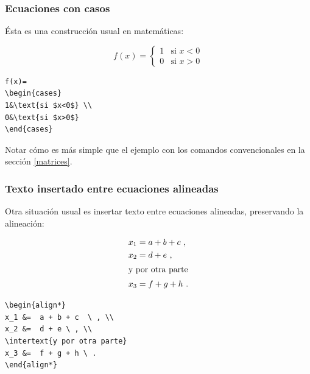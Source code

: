 {\subsubsection{Ecuaciones con casos}

\'Esta es una construcci\'on usual en matem\'aticas:

\vspace{.3cm}
{\small
\begin{minipage}[c]{5cm}
$$
f(x)=
\begin{cases}
1&\text{si $x<0$} \\
0&\text{si $x>0$}
\end{cases}
$$
\end{minipage}
\hspace{.3cm}
\begin{minipage}[c]{5cm}
\begin{verbatim}
f(x)=
\begin{cases}
1&\text{si $x<0$} \\
0&\text{si $x>0$}
\end{cases}
\end{verbatim}
\end{minipage}
}
\vspace{.3cm}

Notar c\'omo es m\'as simple que el ejemplo con los comandos
convencionales en la secci\'on \ref{matrices}.

\subsubsection{Texto insertado entre ecuaciones alineadas}

Otra situaci\'on usual es insertar texto entre ecuaciones alineadas,
preservando la alineaci\'on:

\vspace{.3cm}
{\small
\begin{minipage}[c]{6cm}
\begin{align*}
x_1 &=  a + b + c  \ , \\
x_2 &=  d + e \ ,  \\
\intertext{y por otra parte}
x_3 &=  f + g + h \ .
\end{align*}
\end{minipage}
\hspace{2cm}
\begin{minipage}[t]{6cm}
\vspace{-1.3cm}
\begin{verbatim}
\begin{align*}
x_1 &=  a + b + c  \ , \\
x_2 &=  d + e \ , \\
\intertext{y por otra parte}
x_3 &=  f + g + h \ .
\end{align*}
\end{verbatim}
\end{minipage}
}

}
